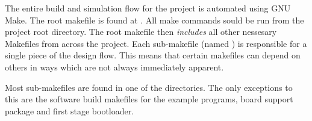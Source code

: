 
The entire build and simulation flow for the \SCARVSOC project is
automated using GNU Make.
The root makefile is found at .
All make commands sould be run from the project root directory.
The root makefile then {\em includes} all other nessesary Makefiles
from across the project.
Each sub-makefile (named ) is responsible for
a single piece of the design flow.
This means that certain makefiles can depend on others in ways which
are not always immediately apparent.

Most sub-makefiles are found in one of the 
directories.
The only exceptions to this are the software build makefiles for
the example programs, board support package and first stage bootloader.

